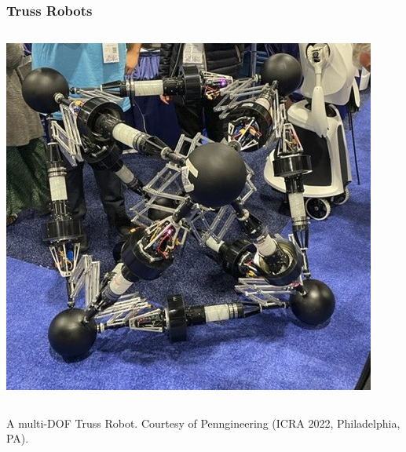 \begin{frame}
	\frametitle{Truss Robots}
	\begin{columns}[b]
		\begin{column}{.7\columnwidth}			
			\begin{tcolorbox}[colframe=blue!80!green, coltitle=white!80,toggle enlargement=none]
				\centering 
				\includegraphics[width=.8\textwidth]{figures/truss.jpg}
			\end{tcolorbox}
		\end{column}	
	\end{columns}
	\centering \footnotesize{A multi-DOF Truss Robot. Courtesy of Penngineering (ICRA 2022, Philadelphia, PA).}
\end{frame}		
		
